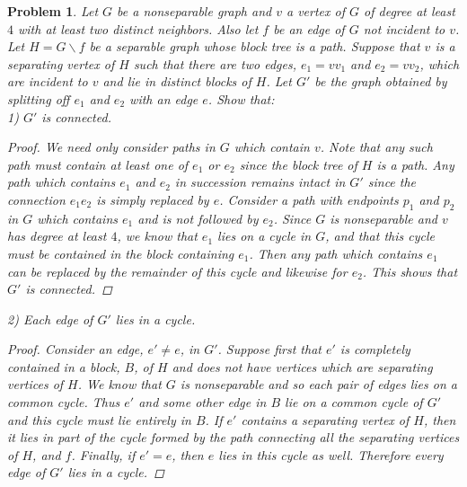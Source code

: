 \documentclass{article}
\newtheorem{problem}{Problem}
\begin{document}
\begin{flushleft}
\begin{problem}
Let $G$ be a nonseparable graph and $v$ a vertex of $G$ of degree at least $4$ with at least two distinct neighbors. Also let $f$ be an edge of $G$ not incident to $v$. Let $H = G \backslash f$ be a separable graph whose block tree is a path. Suppose that $v$ is a separating vertex of $H$ such that there are two edges, $e_1 = vv_1$ and $e_2 = vv_2$, which are incident to $v$ and lie in distinct blocks of $H$. Let $G'$ be the graph obtained by splitting off $e_1$ and $e_2$ with an edge $e$. Show that:\\
1) $G'$ is connected.
\begin{proof}
We need only consider paths in $G$ which contain $v$. Note that any such path must contain at least one of $e_1$ or $e_2$ since the block tree of $H$ is a path. Any path which contains $e_1$ and $e_2$ in succession remains intact in $G'$ since the connection $e_1e_2$ is simply replaced by $e$. Consider a path with endpoints $p_1$ and $p_2$ in $G$ which contains $e_1$ and is not followed by $e_2$. Since $G$ is nonseparable and $v$ has degree at least $4$, we know that $e_1$ lies on a cycle in $G$, and that this cycle must be contained in the block containing $e_1$. Then any path which contains $e_1$ can be replaced by the remainder of this cycle and likewise for $e_2$. This shows that $G'$ is connected.
\end{proof}
2) Each edge of $G'$ lies in a cycle.
\begin{proof}
Consider an edge, $e' \neq e$, in $G'$. Suppose first that $e'$ is completely contained in a block, $B$, of $H$ and does not have vertices which are separating vertices of $H$. We know that $G$ is nonseparable and so each pair of edges lies on a common cycle. Thus $e'$ and some other edge in $B$ lie on a common cycle of $G'$ and this cycle must lie entirely in $B$. If $e'$ contains a separating vertex of $H$, then it lies in part of the cycle formed by the path connecting all the separating vertices of $H$, and $f$. Finally, if $e' = e$, then $e$ lies in this cycle as well. Therefore every edge of $G'$ lies in a cycle.
\end{proof}
\end{problem}


\end{flushleft}
\end{document}
